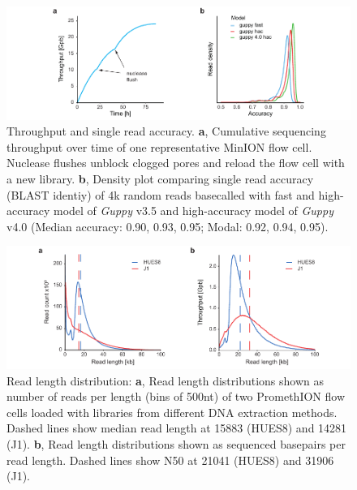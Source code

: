 \begin{figure}[h]
    \centering
    \includegraphics[width=1.0\textwidth]{figures/state_of_art/throughput.pdf}
    \captionsetup{format=plain}
    \caption[Throughput and accuracy]{Throughput and single read accuracy. \textbf{a}, Cumulative sequencing throughput over time of one representative MinION flow cell. Nuclease flushes unblock clogged pores and reload the flow cell with a new library. \textbf{b}, Density plot comparing single read accuracy (BLAST identiy) of 4k random reads basecalled with fast and high-accuracy model of \textit{Guppy} v3.5 and high-accuracy model of \textit{Guppy} v4.0 (Median accuracy: 0.90, 0.93, 0.95; Modal: 0.92, 0.94, 0.95).}
    \label{fig:state_of_art:throughput}
\end{figure}

\begin{figure}[h]
    \centering
    \includegraphics[width=1.0\textwidth]{figures/state_of_art/read_length.pdf}
    \captionsetup{format=plain}
    \caption[Read length median and N50]{Read length distribution: \textbf{a}, Read length distributions shown as number of reads per length (bins of 500nt) of two PromethION flow cells loaded with libraries from different DNA extraction methods. Dashed lines show median read length at 15883 (HUES8) and 14281 (J1). \textbf{b}, Read length distributions shown as sequenced basepairs per read length. Dashed lines show N50 at 21041 (HUES8) and 31906 (J1).}
    \label{fig:state_of_art:read_length}
\end{figure}

